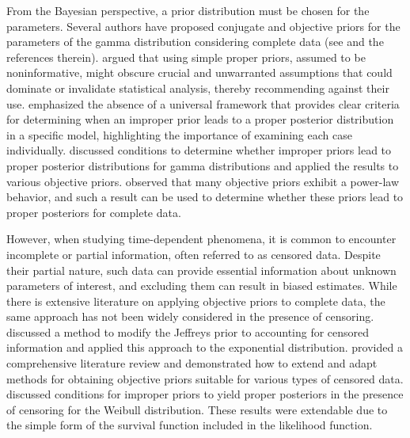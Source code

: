 From the Bayesian perspective, a prior distribution must be chosen for the parameters. Several authors have proposed conjugate and objective priors for the parameters of the gamma distribution considering complete data (see  \cite{son2006bayesian} and the references therein).  \cite{bernardo2005} argued that using simple proper priors, assumed to be noninformative, might obscure crucial and unwarranted assumptions that could dominate or invalidate statistical analysis, thereby recommending against their use.  \cite{northrop2016} emphasized the absence of a universal framework that provides clear criteria for determining when an improper prior leads to a proper posterior distribution in a specific model, highlighting the importance of examining each case individually.  \cite{ramos2021posterior} discussed conditions to determine whether improper priors lead to proper posterior distributions for gamma distributions and applied the results to various objective priors.  \cite{ramos2020power} observed that many objective priors exhibit a power-law behavior, and such a result can be used to determine whether these priors lead to proper posteriors for complete data.


However, when studying time-dependent phenomena, it is common to encounter incomplete or partial information, often referred to as censored data. Despite their partial nature, such data can provide essential information about unknown parameters of interest, and excluding them can result in biased estimates. While there is extensive literature on applying objective priors to complete data, the same approach has not been widely considered in the presence of censoring. \cite{de2001jeffreys} discussed a method to modify the Jeffreys prior to accounting for censored information and applied this approach to the exponential distribution.  \cite{tian2022specifying} provided a comprehensive literature review and demonstrated how to extend and adapt methods for obtaining objective priors suitable for various types of censored data. \cite{ramos2020posterior} discussed conditions for improper priors to yield proper posteriors in the presence of censoring for the Weibull distribution. These results were extendable due to the simple form of the survival function included in the likelihood function.


